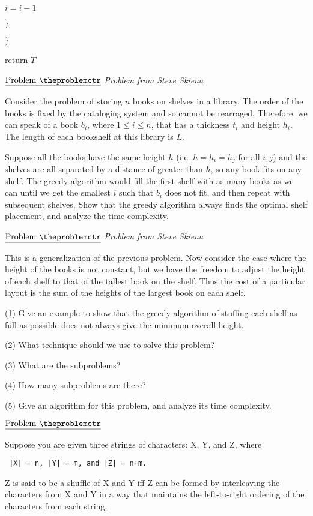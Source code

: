 \documentclass[11pt]{article}
\def\pp{\par\noindent}
\begin{document}
\hspace{1 cm} $i = i-1$

\hspace{.5 cm} $\}$

$\}$

return $T$

\vfill
\newpage

\addtocounter{problemctr}{1}
\bigskip
\noindent
$\underline{\rm Problem\ \theproblemctr}$ {\em Problem from Steve Skiena\/} \pp
Consider the problem of storing $n$ books on shelves in a library. The order
of the books is fixed by the cataloging system and so cannot be rearraged.
Therefore, we can speak of a book $b_i$, where $1 \leq i \leq n$, that
has a thickness $t_i$ and height $h_i$. The length of each bookshelf at this
library is $L$.

\noindent
Suppose all the books have the same height $h$ (i.e.
$h = h_i = h_j$ for all $i, j$) and the shelves are all separated by a
distance of greater than $h$, so any book fits on any shelf. The greedy
algorithm would fill the first shelf with as many books as we can
until we get the smallest $i$ such that $b_i$ does not fit, and then
repeat with subsequent shelves. Show that the greedy algorithm always finds
the optimal shelf placement, and analyze the time complexity.



\addtocounter{problemctr}{1}
\bigskip
\noindent
$\underline{\rm Problem\ \theproblemctr}$ {\em Problem from Steve Skiena\/}\pp
This is a generalization of the previous problem. Now consider the case
where the height of the books is not constant, but we have the freedom
to adjust the height of each shelf to that of the tallest book on the shelf.
Thus the cost of a particular layout is the sum of the heights of the
largest book on each shelf.

\noindent
(1) Give an example to show that the greedy algorithm of stuffing each
shelf as full as possible does not always give the minimum overall
height.

\noindent
(2) What technique should we use to solve this problem?

\noindent
(3) What are the subproblems?

\noindent
(4) How many subproblems are there?

\noindent
(5) Give an algorithm for this problem, and analyze its time complexity.




\addtocounter{problemctr}{1}
\bigskip
\noindent
$\underline{\rm Problem\ \theproblemctr}$\pp
Suppose you are given three strings of characters: X, Y, and Z,
where
\begin{verbatim} |X| = n, |Y| = m, and |Z| = n+m.\end{verbatim}
Z is said to be a shuffle of X and Y iff Z can be formed by interleaving the characters from
X and Y in a
way that maintains the left-to-right ordering of the characters from each
string.
\end{document}

